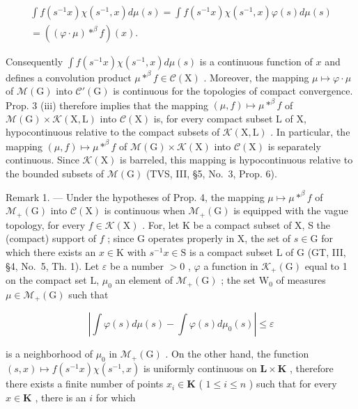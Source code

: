 \[
\begin{array}{c} \int f (s ^ {- 1} x) \chi (s ^ {- 1}, x) d \mu (s) = \int f (s ^ {- 1} x) \chi (s ^ {- 1}, x) \varphi (s) d \mu (s) \\ = ((\varphi \cdot \mu) * ^ {\beta} f) (x). \end{array}
\]

Consequently \(\int f(s^{-1}x)\chi(s^{-1},x)d\mu(s)\) is a continuous function of \(x\) and defines a convolution product \(\mu * ^ {\beta} f\in \mathcal{C}(\mathrm{X})\) . Moreover, the mapping \(\mu \mapsto \varphi \cdot \mu\) of \(\mathcal{M}(\mathrm{G})\) into \(\mathcal{C}'(\mathrm{G})\) is continuous for the topologies of compact convergence. Prop. 3 (iii) therefore implies that the mapping \((\mu ,f)\mapsto \mu * ^ {\beta} f\) of \(\mathcal{M}(\mathrm{G})\times \mathcal{K}(\mathrm{X},\mathrm{L})\) into \(\mathcal{C}(\mathrm{X})\) is, for every compact subset L of X, hypocontinuous relative to the compact subsets of \(\mathcal{K}(\mathrm{X},\mathrm{L})\) . In particular, the mapping \((\mu ,f)\mapsto \mu * ^ {\beta} f\) of \(\mathcal{M}(\mathrm{G})\times \mathcal{K}(\mathrm{X})\) into \(\mathcal{C}(\mathrm{X})\) is separately continuous. Since \(\mathcal{K}(\mathrm{X})\) is barreled, this mapping is hypocontinuous relative to the bounded subsets of \(\mathcal{M}(\mathrm{G})\) (TVS, III, §5, No.~3, Prop. 6).

Remark 1. --- Under the hypotheses of Prop. 4, the mapping \(\mu \mapsto \mu *^{\beta}f\) of \(\mathcal{M}_{+}(\mathrm{G})\) into \(\mathcal{C}(\mathrm{X})\) is continuous when \(\mathcal{M}_{+}(\mathrm{G})\) is equipped with the vague topology, for every \(f\in \mathcal{K}(\mathrm{X})\) . For, let K be a compact subset of X, S the (compact) support of \(f\) ; since G operates properly in X, the set of \(s\in \mathrm{G}\) for which there exists an \(x\in \mathrm{K}\) with \(s^{-1}x\in \mathrm{S}\) is a compact subset L of G (GT, III, §4, No.~5, Th. 1). Let \(\varepsilon\) be a number \(>0\) , \(\varphi\) a function in \(\mathcal{K}_{+}(\mathrm{G})\) equal to 1 on the compact set L, \(\mu_0\) an element of \(\mathcal{M}_{+}(\mathrm{G})\) ; the set \(\mathrm{W}_0\) of measures \(\mu \in \mathcal{M}_{+}(\mathrm{G})\) such that

\[
\left| \int \varphi (s) d \mu (s) - \int \varphi (s) d \mu_ {0} (s) \right| \leqslant \varepsilon
\]

is a neighborhood of \(\mu_0\) in \(\mathcal{M}_{+}(\mathrm{G})\) . On the other hand, the function \((s,x)\mapsto f(s^{-1}x)\chi (s^{-1},x)\) is uniformly continuous on \(\mathbf{L}\times \mathbf{K}\) , therefore there exists a finite number of points \(x_{i}\in \mathbf{K}\) ( \(1\leqslant i\leqslant n\) ) such that for every \(x\in \mathbf{K}\) , there is an \(i\) for which


